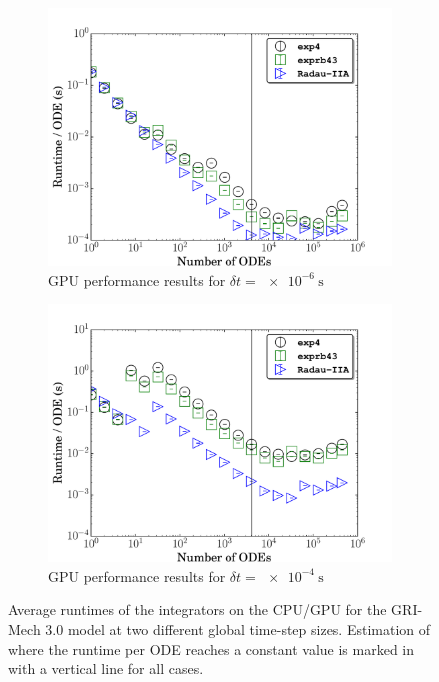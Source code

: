 \documentclass[final,twocolumn]{elsarticle}
\begin{document}
\begin{figure}[htb]
  \begin{subfigure}{0.49\textwidth}
      \includegraphics[width=\linewidth]{CH4_1e-06_gpu.pdf}
      \caption{GPU performance results for $\delta t = \SI{e-6}{\second}$}
      \label{F:ch4_gpu_perf_small}
  \end{subfigure}
  \begin{subfigure}{0.49\textwidth}
      \includegraphics[width=\linewidth]{CH4_1e-04_gpu.pdf}
      \caption{GPU performance results for $\delta t = \SI{e-4}{\second}$}
      \label{F:ch4_gpu_perf_large}
  \end{subfigure}
  \caption{Average runtimes of the integrators on the CPU\slash GPU for the GRI-Mech 3.0 model at two different global time-step sizes.
  Estimation of where the runtime per ODE reaches a constant value is marked in with a vertical line for all cases.}
  \label{F:CH4_perf}
\end{figure}
\end{document}
